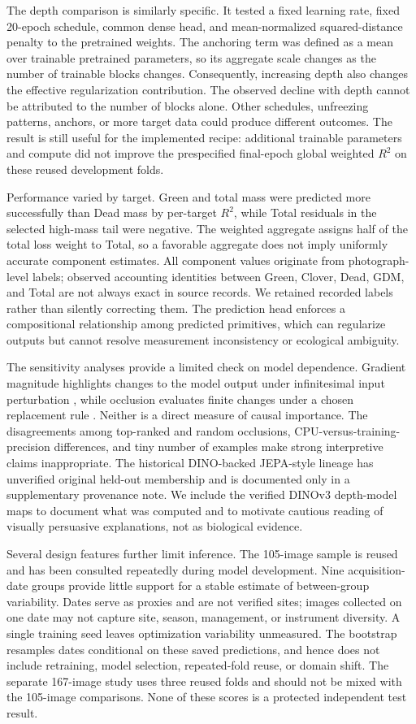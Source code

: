 \documentclass[pdflatex,a4paper,sn-nature]{sn-jnl}
\begin{document}
The depth comparison is similarly specific. It tested a fixed learning rate, fixed 20-epoch schedule, common dense head, and mean-normalized squared-distance penalty to the pretrained weights. The anchoring term was defined as a mean over trainable pretrained parameters, so its aggregate scale changes as the number of trainable blocks changes. Consequently, increasing depth also changes the effective regularization contribution. The observed decline with depth cannot be attributed to the number of blocks alone. Other schedules, unfreezing patterns, anchors, or more target data could produce different outcomes. The result is still useful for the implemented recipe: additional trainable parameters and compute did not improve the prespecified final-epoch global weighted $R^2$ on these reused development folds.

Performance varied by target. Green and total mass were predicted more successfully than Dead mass by per-target $R^2$, while Total residuals in the selected high-mass tail were negative. The weighted aggregate assigns half of the total loss weight to Total, so a favorable aggregate does not imply uniformly accurate component estimates. All component values originate from photograph-level labels; observed accounting identities between Green, Clover, Dead, GDM, and Total are not always exact in source records. We retained recorded labels rather than silently correcting them. The prediction head enforces a compositional relationship among predicted primitives, which can regularize outputs but cannot resolve measurement inconsistency or ecological ambiguity.

The sensitivity analyses provide a limited check on model dependence. Gradient magnitude highlights changes to the model output under infinitesimal input perturbation \cite{simonyan2014saliency}, while occlusion evaluates finite changes under a chosen replacement rule \cite{zeiler2014occlusion}. Neither is a direct measure of causal importance. The disagreements among top-ranked and random occlusions, CPU-versus-training-precision differences, and tiny number of examples make strong interpretive claims inappropriate. The historical DINO-backed JEPA-style lineage has unverified original held-out membership and is documented only in a supplementary provenance note. We include the verified DINOv3 depth-model maps to document what was computed and to motivate cautious reading of visually persuasive explanations, not as biological evidence.

Several design features further limit inference. The 105-image sample is reused and has been consulted repeatedly during model development. Nine acquisition-date groups provide little support for a stable estimate of between-group variability. Dates serve as proxies and are not verified sites; images collected on one date may not capture site, season, management, or instrument diversity. A single training seed leaves optimization variability unmeasured. The bootstrap resamples dates conditional on these saved predictions, and hence does not include retraining, model selection, repeated-fold reuse, or domain shift. The separate 167-image study uses three reused folds and should not be mixed with the 105-image comparisons. None of these scores is a protected independent test result.
\end{document}
